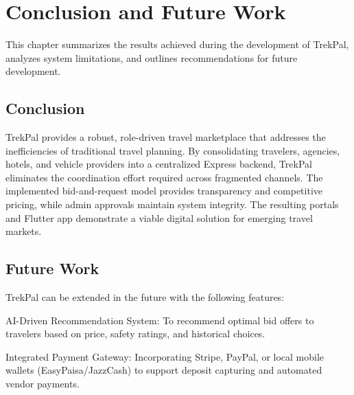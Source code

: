 \documentclass[12pt,a4paper]{article}
\newlength{\ThesisParagraphIndent}
\newcommand{\ThesisParagraph}[1]{%
  \par\begingroup
  \setlength{\leftskip}{\ThesisParagraphIndent}%
  \setlength{\parindent}{0pt}%
  \noindent#1\par
  \endgroup}
\begin{document}
\section{Conclusion and Future Work}

\ThesisParagraph{This chapter summarizes the results achieved during the development of TrekPal, analyzes system limitations, and outlines recommendations for future development.}


\subsection{Conclusion}

\ThesisParagraph{TrekPal provides a robust, role-driven travel marketplace that addresses the inefficiencies of traditional travel planning. By consolidating travelers, agencies, hotels, and vehicle providers into a centralized Express backend, TrekPal eliminates the coordination effort required across fragmented channels. The implemented bid-and-request model provides transparency and competitive pricing, while admin approvals maintain system integrity. The resulting portals and Flutter app demonstrate a viable digital solution for emerging travel markets.}


\subsection{Future Work}

\ThesisParagraph{TrekPal can be extended in the future with the following features:}


\begin{list}{}{\setlength{\leftmargin}{\dimexpr\ThesisParagraphIndent+1.5em\relax}\setlength{\labelsep}{0.5em}\setlength{\topsep}{2pt}\setlength{\parsep}{0pt}}
\item[1.] AI-Driven Recommendation System: To recommend optimal bid offers to travelers based on price, safety ratings, and historical choices.
\end{list}


\begin{list}{}{\setlength{\leftmargin}{\dimexpr\ThesisParagraphIndent+1.5em\relax}\setlength{\labelsep}{0.5em}\setlength{\topsep}{2pt}\setlength{\parsep}{0pt}}
\item[2.] Integrated Payment Gateway: Incorporating Stripe, PayPal, or local mobile wallets (EasyPaisa/JazzCash) to support deposit capturing and automated vendor payments.
\end{list}
\end{document}
